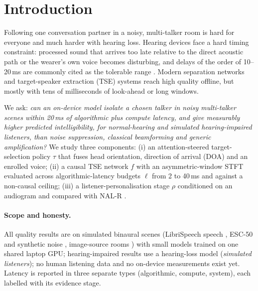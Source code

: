 \section{Introduction}
Following one conversation partner in a noisy, multi-talker room is hard for everyone and much harder
with hearing loss. Hearing devices face a hard timing constraint: processed sound that arrives too
late relative to the direct acoustic path or the wearer's own voice becomes disturbing, and delays of
the order of 10--20\,ms are commonly cited as the tolerable range \citep{stone1999delay}. Modern
separation networks \citep{luo2019convtasnet,luo2020dprnn,wang2023tfgridnet} and target-speaker
extraction (TSE) systems \citep{zmolikova2019speakerbeam,wang2019voicefilter,wang2020voicefilterlite}
reach high quality offline, but mostly with tens of milliseconds of look-ahead or long windows.

We ask: \emph{can an on-device model isolate a chosen talker in noisy multi-talker scenes within
20\,ms of algorithmic plus compute latency, and give measurably higher predicted intelligibility, for
normal-hearing and simulated hearing-impaired listeners, than noise suppression, classical
beamforming and generic amplification?} We study three components: (i) an attention-steered
target-selection policy $\tau$ that fuses head orientation, direction of arrival (DOA) and an
enrolled voice; (ii) a causal TSE network $f$ with an asymmetric-window STFT
\citep{mauler2007lowdelay,wang2023lowlatency} evaluated across algorithmic-latency budgets $\ell$
from 2 to 40\,ms and against a non-causal ceiling; (iii) a listener-personalisation stage $\rho$
conditioned on an audiogram and compared with NAL-R \citep{byrne1986nal}.

\paragraph{Scope and honesty.} All quality results are on simulated binaural scenes (LibriSpeech
speech \citep{panayotov2015librispeech}, ESC-50 and synthetic noise \citep{piczak2015esc},
image-source rooms \citep{scheibler2018pyroomacoustics}) with small models trained on one shared
laptop GPU; hearing-impaired results use a hearing-loss model (\emph{simulated listeners}); no human
listening data and no on-device measurements exist yet. Latency is reported in three separate
types (algorithmic, compute, system), each labelled with its evidence stage.
